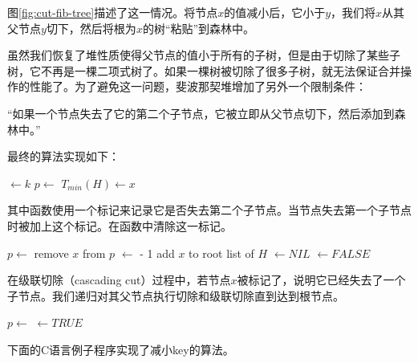\documentclass[b5paper]{ctexart}
\begin{document}
图\ref{fig:cut-fib-tree}描述了这一情况。将节点$x$的值减小后，它小于$y$，我们将$x$从其父节点$y$切下，然后将根为$x$的树“粘贴”到森林中。

虽然我们恢复了堆性质使得父节点的值小于所有的子树，但是由于切除了某些子树，它不再是一棵二项式树了。如果一棵树被切除了很多子树，就无法保证合并操作的性能了。为了避免这一问题，斐波那契堆增加了另外一个限制条件：

“如果一个节点失去了它的第二个子节点，它被立即从父节点切下，然后添加到森林中。”

最终的算法实现如下：

\begin{algorithmic}[1]
  \State {} $\gets k$
  \State $p \gets $ 
    \State {}
    \State {}
  \EndIf
    \State $T_{min}(H) \gets x$
  \EndIf
\EndFunction
\end{algorithmic}

其中函数使用一个标记来记录它是否失去第二个子节点。当节点失去第一个子节点时被加上这个标记。在函数中清除这一标记。

\begin{algorithmic}[1]
  \State $p \gets $ 
  \State remove $x$ from $p$
  \State {} $\gets$  - 1
  \State add $x$ to root list of $H$
  \State {} $\gets NIL$
  \State {} $\gets FALSE$
\EndFunction
\end{algorithmic}

在级联切除（cascading cut）过程中，若节点$x$被标记了，说明它已经失去了一个子节点。我们递归对其父节点执行切除和级联切除直到达到根节点。

\begin{algorithmic}[1]
  \State $p \gets $ 
      \State {} $\gets TRUE$
    \Else
      \State {}
      \State {}
    \EndIf
  \EndIf
\EndFunction
\end{algorithmic}

下面的C语言例子程序实现了减小key的算法。
\end{document}
